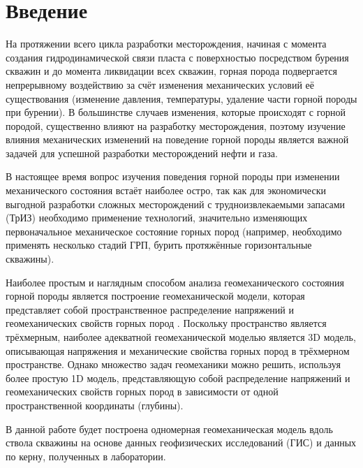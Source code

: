 \chapter*{Введение} %

На протяжении всего цикла разработки месторождения, начиная с момента создания гидродинамической связи пласта с поверхностью посредством бурения скважин и до момента ликвидации всех скважин, горная порода подвергается непрерывному воздействию за счёт изменения механических условий её существования (изменение давления, температуры, удаление части горной породы при бурении).
В большинстве случаев изменения, которые происходят с горной породой, существенно влияют на разработку месторождения, поэтому изучение влияния механических изменений на поведение горной породы является важной задачей для успешной разработки месторождений нефти и газа.

В настоящее время вопрос изучения поведения горной породы при изменении механического состояния встаёт наиболее остро, так как для экономически выгодной разработки сложных месторождений с трудноизвлекаемыми запасами (ТрИЗ) необходимо применение технологий, значительно изменяющих первоначальное механическое состояние горных пород (например, необходимо применять несколько стадий ГРП, бурить протяжённые горизонтальные скважины).

Наиболее простым и наглядным способом анализа геомеханического состояния горной породы является построение геомеханической модели, которая представляет собой пространственное распределение напряжений и геомеханических свойств горных пород \cite{aliev_book, zobak_book, konoshonkin_book}.
Поскольку пространство является трёхмерным, наиболее адекватной геомеханической моделью является 3D модель, описывающая напряжения и механические свойства горных пород в трёхмерном пространстве.
Однако множество задач геомеханики можно решить, используя более простую 1D модель, представляющую собой распределение напряжений и геомеханических свойств горных пород в зависимости от одной пространственной координаты (глубины).

В данной работе будет построена одномерная геомеханическая модель вдоль ствола скважины на основе данных геофизических исследований (ГИС) и данных по керну, полученных в лаборатории.




